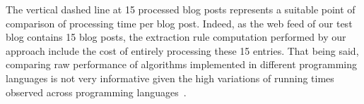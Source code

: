 The vertical dashed line at 15 processed blog posts represents a suitable point of comparison of processing time per blog post. Indeed, as the web feed of our test blog contains 15 blog posts, the extraction rule computation performed by our approach include the cost of entirely processing these 15 entries. That being said, comparing raw performance of algorithms implemented in different programming languages is not very informative given the high variations of running times observed across programming languages~\cite{hundt2011}.
